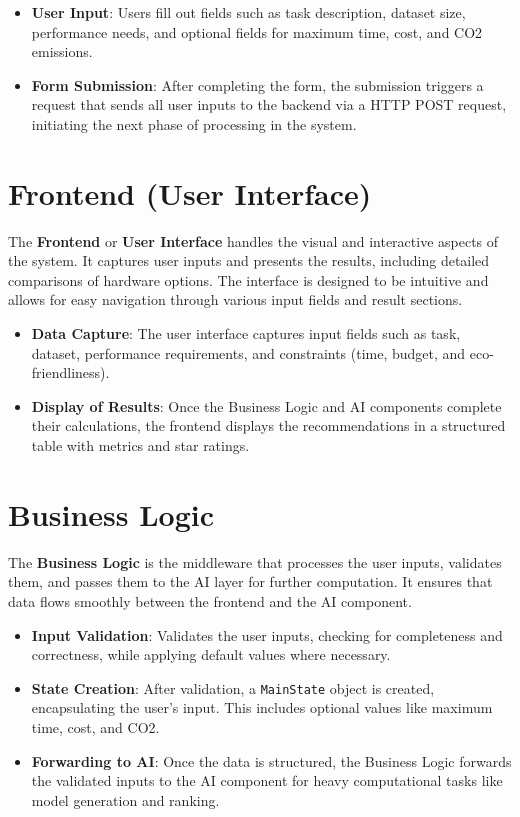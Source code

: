 \documentclass{report}
\begin{document}
\begin{itemize}
    \item \textbf{User Input}: Users fill out fields such as task description, dataset size, performance needs, and optional fields for maximum time, cost, and CO2 emissions.
    \item \textbf{Form Submission}: After completing the form, the submission triggers a request that sends all user inputs to the backend via a HTTP POST request, initiating the next phase of processing in the system.
\end{itemize}

\section{Frontend (User Interface)}
The \textbf{Frontend} or \textbf{User Interface} handles the visual and interactive aspects of the system. It captures user inputs and presents the results, including detailed comparisons of hardware options. The interface is designed to be intuitive and allows for easy navigation through various input fields and result sections.

\begin{itemize}
    \item \textbf{Data Capture}: The user interface captures input fields such as task, dataset, performance requirements, and constraints (time, budget, and eco-friendliness).
    \item \textbf{Display of Results}: Once the Business Logic and AI components complete their calculations, the frontend displays the recommendations in a structured table with metrics and star ratings.
\end{itemize}

\section{Business Logic}
The \textbf{Business Logic} is the middleware that processes the user inputs, validates them, and passes them to the AI layer for further computation. It ensures that data flows smoothly between the frontend and the AI component.

\begin{itemize}
    \item \textbf{Input Validation}: Validates the user inputs, checking for completeness and correctness, while applying default values where necessary.
    \item \textbf{State Creation}: After validation, a \texttt{MainState} object is created, encapsulating the user's input. This includes optional values like maximum time, cost, and CO2.
    \item \textbf{Forwarding to AI}: Once the data is structured, the Business Logic forwards the validated inputs to the AI component for heavy computational tasks like model generation and ranking.
\end{itemize}
\end{document}
